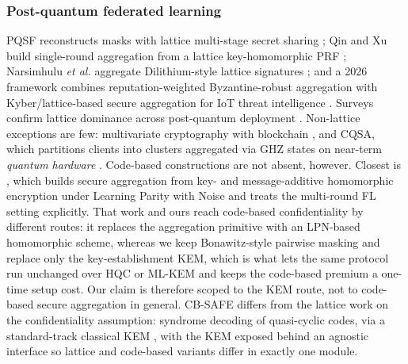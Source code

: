 \documentclass[lettersize,journal]{IEEEtran}
\begin{document}
\subsubsection{Post-quantum federated learning} PQSF reconstructs masks with lattice
multi-stage secret sharing \cite{pqsf2024}; Qin and Xu build single-round aggregation
from a lattice key-homomorphic PRF \cite{qinxu2025}; Narsimhulu \emph{et al.}
aggregate Dilithium-style lattice signatures \cite{narsimhulu2026}; and a 2026
framework combines reputation-weighted Byzantine-robust aggregation with
Kyber/lattice-based secure aggregation for IoT threat intelligence
\cite{byzpqfl2026}. Surveys confirm lattice dominance across post-quantum deployment
\cite{nguyen2025lattice}. Non-lattice exceptions are few: multivariate
cryptography with blockchain \cite{singh2025pqfog}, and CQSA, which partitions
clients into clusters aggregated via GHZ states on near-term \emph{quantum hardware}
\cite{cqsa2026}. Code-based constructions are not absent, however. Closest is
\cite{lpnsecagg2026}, which builds secure aggregation from key- and
message-additive homomorphic encryption under Learning Parity with Noise and treats
the multi-round FL setting explicitly. That work and ours reach code-based
confidentiality by different routes: it replaces the aggregation primitive with an
LPN-based homomorphic scheme, whereas we keep Bonawitz-style pairwise masking and
replace only the key-establishment KEM, which is what lets the same protocol run
unchanged over HQC or ML-KEM and keeps the code-based premium a one-time setup cost. Our claim is therefore scoped to the KEM route, not to
code-based secure aggregation in general. CB-SAFE differs from the lattice work on the confidentiality
assumption: syndrome decoding of quasi-cyclic codes, via a standard-track classical
KEM \cite{nistir8545}, with the KEM exposed behind an agnostic interface so lattice
and code-based variants differ in exactly one module.
\end{document}
